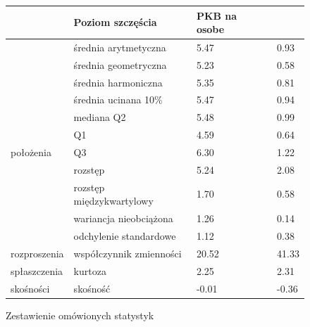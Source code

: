 \documentclass{article}
\theoremstyle{break}
\begin{document}
\begin{figure}[H]
	\begin{longtable}[l]{|ll|l|l|}
		\hline
		\rowcolor[HTML]{C0C0C0} 
		\multicolumn{2}{|l|}{\cellcolor[HTML]{C0C0C0}Miary}                             & Poziom szczęścia & PKB na osobe \\ \hline
		\multicolumn{1}{|l|}{}                               & średnia arytmetyczna     & 5.47             & 0.93         \\ \cline{2-4} 
		\multicolumn{1}{|l|}{}                               & średnia geometryczna     & 5.23             & 0.58         \\ \cline{2-4} 
		\multicolumn{1}{|l|}{}                               & średnia harmoniczna      & 5.35             & 0.81         \\ \cline{2-4} 
		\multicolumn{1}{|l|}{}                               & średnia ucinana 10\%     & 5.47             & 0.94         \\ \cline{2-4} 
		\multicolumn{1}{|l|}{}                               & mediana Q2               & 5.48             & 0.99         \\ \cline{2-4} 
		\multicolumn{1}{|l|}{}                               & Q1                       & 4.59             & 0.64         \\ \cline{2-4} 
		\multicolumn{1}{|l|}{położenia}    & Q3                       & 6.30             & 1.22         \\ \hline
		\multicolumn{1}{|l|}{}                               & rozstęp                  & 5.24             & 2.08         \\ \cline{2-4} 
		\multicolumn{1}{|l|}{}                               & rozstęp międzykwartylowy & 1.70             & 0.58         \\ \cline{2-4} 
		\multicolumn{1}{|l|}{}                               & wariancja nieobciążona   & 1.26             & 0.14         \\ \cline{2-4} 
		\multicolumn{1}{|l|}{}                               & odchylenie standardowe   & 1.12             & 0.38         \\ \cline{2-4} 
		\multicolumn{1}{|l|}{rozproszenia} & współczynnik zmienności  & 20.52            & 41.33        \\ \hline
		\multicolumn{1}{|l|}{spłaszczenia}                   & kurtoza                  & 2.25             & 2.31         \\ \hline
		\multicolumn{1}{|l|}{skośności}                      & skośność                 & -0.01            & -0.36        \\ \hline
	\end{longtable}
	\caption{Zestawienie omówionych statystyk}
\end{figure}
	
\end{document}
